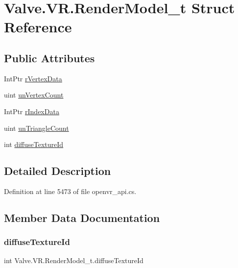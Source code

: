 \hypertarget{struct_valve_1_1_v_r_1_1_render_model__t}{}\section{Valve.\+V\+R.\+Render\+Model\+\_\+t Struct Reference}
\label{struct_valve_1_1_v_r_1_1_render_model__t}
\subsection*{Public Attributes}
\begin{DoxyCompactItemize}
\item 
Int\+Ptr \mbox{\hyperlink{struct_valve_1_1_v_r_1_1_render_model__t_a0fe7d2bbb9e09c892fd167dd5a6bb879}{r\+Vertex\+Data}}
\item 
uint \mbox{\hyperlink{struct_valve_1_1_v_r_1_1_render_model__t_a11ba36b952be53e24ea7e8f45c9a61dc}{un\+Vertex\+Count}}
\item 
Int\+Ptr \mbox{\hyperlink{struct_valve_1_1_v_r_1_1_render_model__t_ab2da6f03de926cb050d962574a368de7}{r\+Index\+Data}}
\item 
uint \mbox{\hyperlink{struct_valve_1_1_v_r_1_1_render_model__t_a2cda858aedafdf0b924b2a502e3246d8}{un\+Triangle\+Count}}
\item 
int \mbox{\hyperlink{struct_valve_1_1_v_r_1_1_render_model__t_a97ba56794c72d5cc36dc96a643ca001a}{diffuse\+Texture\+Id}}
\end{DoxyCompactItemize}


\subsection{Detailed Description}


Definition at line 5473 of file openvr\+\_\+api.\+cs.



\subsection{Member Data Documentation}
\mbox{\label{struct_valve_1_1_v_r_1_1_render_model__t_a97ba56794c72d5cc36dc96a643ca001a}} 
\subsubsection{\texorpdfstring{diffuseTextureId}{diffuseTextureId}}
{\footnotesize\ttfamily int Valve.\+V\+R.\+Render\+Model\+\_\+t.\+diffuse\+Texture\+Id}



